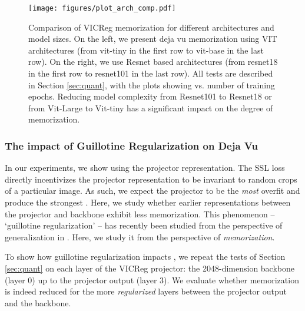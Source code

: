 \begin{figure}[ht]
\captionsetup[subfigure]{font=scriptsize,labelfont=scriptsize}
     \centering
     \texttt{[image: figures/plot\_arch\_comp.pdf]}
     \caption[Comparison of VICReg \dejavu memorization for different architectures and model sizes.]{Comparison of VICReg \dejavu memorization for different architectures and model sizes. On the left, we present deja vu memorization using VIT architectures (from vit-tiny in the first row to vit-base in the last row). On the right, we use Resnet based architectures (from resnet18 in the first row to resnet101 in the last row). All tests are described in Section \ref{sec:quant}, with the plots showing \dejavu vs. number of training epochs. Reducing model complexity from Resnet101 to Resnet18 or from Vit-Large to Vit-tiny has a significant impact on the degree of memorization.}
\label{fig:rn101 v. rn50}
\end{figure}

\clearpage

\subsubsection{The impact of Guillotine Regularization on Deja Vu}
\label{sec:guillotine}
In our experiments, we show \dejavu using the projector representation. The SSL loss directly incentivizes the projector representation to be invariant to random crops of a particular image. As such, we expect the projector to be the \emph{most} overfit and produce the strongest \dejavu. Here, we study whether earlier representations between the projector and backbone exhibit less \dejavu memorization. This phenomenon -- `guillotine regularization' -- has recently been studied from the perspective of generalization in \citet{Guillotine}. Here, we study it from the perspective of \emph{memorization}. 

To show how guillotine regularization impacts \dejavu, we repeat the tests of Section \ref{sec:quant} on each layer of the VICReg projector: the 2048-dimension backbone (layer 0) up to the projector output (layer 3). We evaluate whether memorization is indeed reduced for the more \emph{regularized} layers between the projector output and the backbone. 

